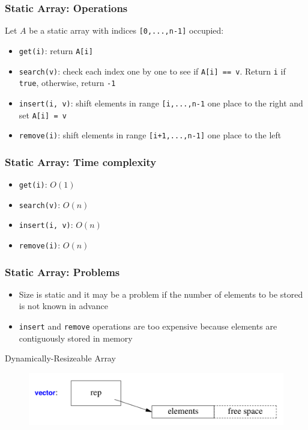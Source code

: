 \documentclass{beamer}
\begin{document}
\begin{frame}[fragile]
\frametitle{Static Array: Operations}
	Let $A$ be a static array with indices \verb|[0,...,n-1]| occupied:
	\begin{itemize}
		\item \verb|get(i)|: return \verb|A[i]|
		\item \verb|search(v)|: check each index one by one to see if \verb|A[i] == v|. Return \verb|i| if \verb|true|, otherwise, return \verb|-1|
		\item \verb|insert(i, v)|: shift elements in range \verb|[i,...,n-1| one place to the right and set \verb|A[i] = v|
		\item \verb|remove(i)|: shift elements in range \verb|[i+1,...,n-1]| one place to the left
	\end{itemize}
\end{frame}

\begin{frame}[fragile]
\frametitle{Static Array: Time complexity}
		\begin{itemize}
		\item \verb|get(i)|: \color{red}$O(1)$\color{black}
		\item \verb|search(v)|: \color{red}$O(n)$\color{black}
		\item \verb|insert(i, v)|: \color{red}$O(n)$\color{black}
		\item \verb|remove(i)|: \color{red}$O(n)$\color{black}
	\end{itemize}
\end{frame}

\begin{frame}[fragile]
\frametitle{Static Array: Problems}
	\begin{itemize}
		\item Size is static and it may be a problem if the number of elements to be stored is not known in advance
		\item \verb|insert| and \verb|remove| operations are too expensive because elements are contiguously stored in memory
	\end{itemize}
\end{frame}

\begin{frame}[fragile]{Dynamically-Resizeable Array}
    \begin{figure}
        \centering
        \includegraphics[scale=0.28]{imgs/2-LDS/vector.png}
    \end{figure}
\end{frame}
\end{document}
